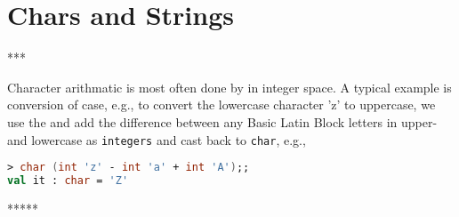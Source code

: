 
\section{Chars and Strings}
***

Character arithmatic is most often done by in integer space. A typical example is conversion of case, e.g., to convert the lowercase character 'z' to uppercase, we use the  and add the difference between any Basic Latin Block letters in upper- and lowercase as \lstinline{integers} and cast back to \lstinline{char}, e.g.,
%
\begin{lstlisting}[language=fsharp,caption={fsharpi, converting case by casting and integer arithmatic.}]
> char (int 'z' - int 'a' + int 'A');; 
val it : char = 'Z'
\end{lstlisting}
%

*****

